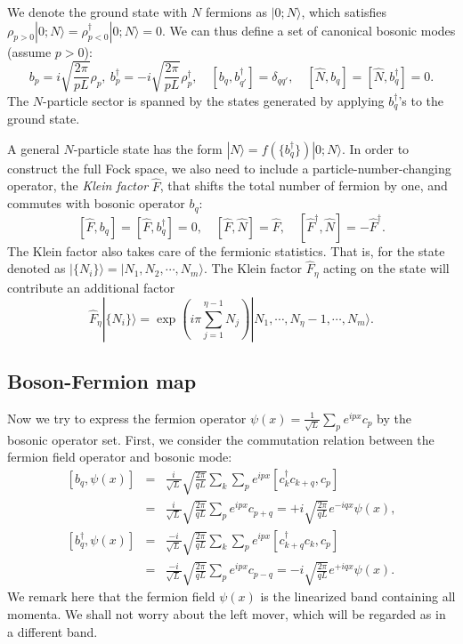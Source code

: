 \documentclass{SciPost}
\begin{document}
We denote the ground state with $N$ fermions as $|0;N\rangle$, which satisfies $\rho_{p>0}|0;N\rangle = \rho^\dagger_{p<0}|0;N\rangle = 0$.
We can thus define a set of canonical bosonic modes (assume $p>0$):
\begin{equation}
	b_p = i \sqrt{\frac{2\pi}{pL}}\rho_p,\ 
	b_p^\dagger = -i\sqrt{\frac{2\pi}{pL}}\rho_p^\dagger, \quad
	[b_q,b_{q'}^\dagger] = \delta_{qq'},\quad
	[\hat N, b_q] = [\hat N, b_q^\dagger] = 0.
\end{equation}
The $N$-particle sector is spanned by the states generated by applying $b_q^\dagger$'s to the ground state.

A general $N$-particle state has the form $|N\rangle = f(\{b_q^\dagger\})|0;N\rangle$.
In order to construct the full Fock space, we also need to include a particle-number-changing operator, the \textit{Klein factor} $\hat F$, that shifts the total number of fermion by one, and commutes with bosonic operator $b_q$:
\begin{equation}
	\left[\hat F, b_q \right] = \left[\hat F, b_q^\dagger \right] = 0, \quad
	\left[\hat F, \hat N \right] = \hat F, \quad 
	\left[\hat F^\dagger, \hat N \right] = -\hat F^\dagger.
\end{equation}
The Klein factor also takes care of the fermionic statistics. 
That is, for the state denoted as $|\{N_i\}\rangle = |N_1,N_2,\cdots,N_m\rangle$.
The Klein factor $\hat F_\eta$ acting on the state will contribute an additional factor
\begin{equation*}
	\hat F_\eta|\{N_i\}\rangle = \exp\left(i\pi\sum_{j=1}^{\eta-1}N_j\right)|N_1,\cdots,N_\eta-1,\cdots,N_m\rangle.
\end{equation*}



\subsection{Boson-Fermion map}
Now we try to express the fermion operator $\psi(x) = \frac{1}{\sqrt{L}} \sum_p e^{ipx} c_{p}$
by the bosonic operator set.
First, we consider the commutation relation between the fermion field operator and bosonic mode:
\begin{eqnarray}
	\left[b_q,\psi(x)\right] 
	&=& \frac{i}{\sqrt L}\sqrt{\frac{2\pi}{qL}}\sum_{k}\sum_{p} e^{ipx} [c^\dagger_{k}c_{k+q},c_{p}] \nonumber \\
	&=& \frac{i}{\sqrt L} \sqrt{\frac{2\pi}{qL}} \sum_{p} e^{ipx} c_{p+q} 
	= +i\sqrt{\frac{2\pi}{qL}} e^{-iqx} \psi(x), \label{eq:bs-comm-1} \\ 
	\left[b_q^\dagger,\psi(x)\right] 
	&=& \frac{-i}{\sqrt L}\sqrt{\frac{2\pi}{qL}}\sum_{k}\sum_{p} e^{ipx} [c^\dagger_{k+q}c_{k},c_{p}] \nonumber \\
	&=& \frac{-i}{\sqrt L} \sqrt{\frac{2\pi}{qL}} \sum_{p} e^{ipx} c_{p-q} 
	= -i\sqrt{\frac{2\pi}{qL}} e^{+iqx}\psi(x). \label{eq:bs-comm-2}
\end{eqnarray}
We remark here that the fermion field $\psi(x)$ is the linearized band containing all momenta.
We shall not worry about the left mover, which will be regarded as in a different band.
\end{document}
